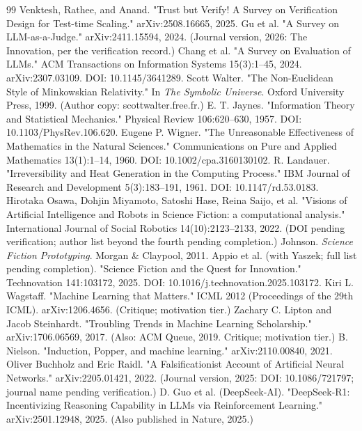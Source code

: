 \documentclass[11pt,a4paper]{article}
\begin{document}
\begin{thebibliography}{99}
 Venktesh, Rathee, and Anand. "Trust but Verify! A Survey on Verification Design for Test-time Scaling." arXiv:2508.16665, 2025.
 Gu et al. "A Survey on LLM-as-a-Judge." arXiv:2411.15594, 2024. (Journal version, 2026: The Innovation, per the verification record.)
 Chang et al. "A Survey on Evaluation of LLMs." ACM Transactions on Information Systems 15(3):1–45, 2024. arXiv:2307.03109. DOI: 10.1145/3641289.
 Scott Walter. "The Non-Euclidean Style of Minkowskian Relativity." In \textit{The Symbolic Universe}. Oxford University Press, 1999. (Author copy: scottwalter.free.fr.)
 E. T. Jaynes. "Information Theory and Statistical Mechanics." Physical Review 106:620–630, 1957. DOI: 10.1103/PhysRev.106.620.
 Eugene P. Wigner. "The Unreasonable Effectiveness of Mathematics in the Natural Sciences." Communications on Pure and Applied Mathematics 13(1):1–14, 1960. DOI: 10.1002/cpa.3160130102.
 R. Landauer. "Irreversibility and Heat Generation in the Computing Process." IBM Journal of Research and Development 5(3):183–191, 1961. DOI: 10.1147/rd.53.0183.
 Hirotaka Osawa, Dohjin Miyamoto, Satoshi Hase, Reina Saijo, et al. "Visions of Artificial Intelligence and Robots in Science Fiction: a computational analysis." International Journal of Social Robotics 14(10):2123–2133, 2022. (DOI pending verification; author list beyond the fourth pending completion.)
 Johnson. \textit{Science Fiction Prototyping}. Morgan \& Claypool, 2011.
 Appio et al. (with Yaszek; full list pending completion). "Science Fiction and the Quest for Innovation." Technovation 141:103172, 2025. DOI: 10.1016/j.technovation.2025.103172.
 Kiri L. Wagstaff. "Machine Learning that Matters." ICML 2012 (Proceedings of the 29th ICML). arXiv:1206.4656. (Critique; motivation tier.)
 Zachary C. Lipton and Jacob Steinhardt. "Troubling Trends in Machine Learning Scholarship." arXiv:1706.06569, 2017. (Also: ACM Queue, 2019. Critique; motivation tier.)
 B. Nielson. "Induction, Popper, and machine learning." arXiv:2110.00840, 2021.
 Oliver Buchholz and Eric Raidl. "A Falsificationist Account of Artificial Neural Networks." arXiv:2205.01421, 2022. (Journal version, 2025: DOI: 10.1086/721797; journal name pending verification.)
 D. Guo et al. (DeepSeek-AI). "DeepSeek-R1: Incentivizing Reasoning Capability in LLMs via Reinforcement Learning." arXiv:2501.12948, 2025. (Also published in Nature, 2025.)

\end{thebibliography}
\end{document}
